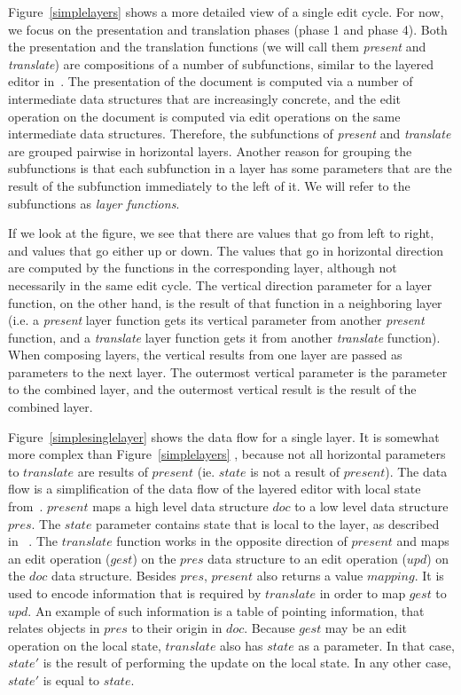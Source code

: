 Figure~\ref{simplelayers}  shows a more detailed view of a single edit cycle. For now, we focus on the presentation and translation phases (phase 1 and phase 4). Both the presentation and the translation functions (we will call them {\em present} and {\em translate}) are compositions of a number of subfunctions, similar to the layered editor in~\cite{architecture}. The presentation of the document is computed via a number of intermediate data structures that are increasingly concrete, and the edit operation on the document is computed via edit operations on the same intermediate data structures. Therefore, the subfunctions of {\em present} and {\em translate} are grouped pairwise in horizontal layers. Another reason for grouping the subfunctions is that each subfunction in a layer has some parameters that are the result of the subfunction immediately to the left of it. We will refer to the subfunctions as {\em layer functions}.

If we look at the figure, we see that there are values that go from left to right, and values that go either up or down. The values that go in horizontal direction are computed by the functions in the corresponding layer, although not necessarily in the same edit cycle. The vertical direction parameter for a layer function, on the other hand, is the result of that function in a neighboring layer (i.e. a {\em present} layer function gets its vertical parameter from another {\em present} function, and a {\em translate} layer function gets it from another {\em translate} function). When composing layers, the vertical results from one layer are passed as parameters to the next layer. The outermost vertical parameter is the parameter to the combined layer, and the outermost vertical result is the result of the combined layer. 


Figure~\ref{simplesinglelayer} shows the data flow for a single layer. It is somewhat more complex than Figure~\ref{simplelayers} , because not all horizontal parameters to $translate$ are results of $present$  (ie. $state$ is not a result of $present$). The data flow is a simplification of the data flow of the layered editor with local state from~\cite{architecture}. $present$ maps a high level data structure $doc$ to a low level data structure $pres$. The $state$ parameter contains state that is local to the layer, as described in~\cite{architecture} . The $translate$ function works in the opposite direction of $present$ and maps an edit operation ($gest$) on the $pres$ data structure to an edit operation ($upd$) on the $doc$ data structure. Besides $pres$, $present$ also returns a value $mapping$. It is used to encode information that is required by $translate$ in order to map $gest$ to $upd$. An example of such information is a table of pointing information, that relates objects in $pres$ to their origin in $doc$. Because $gest$ may be an edit operation on the local state, $translate$ also has $state$ as a parameter. In that case, $state'$ is the result of performing the update on the local state. In any other case, $state'$ is equal to $state$. 

